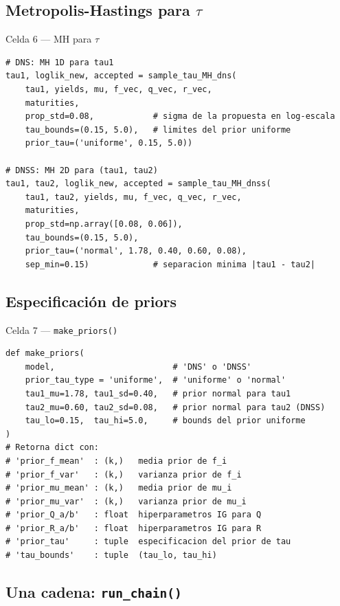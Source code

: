 \documentclass[12pt, a4paper]{article}
\theoremstyle{plain}
\theoremstyle{definition}
\theoremstyle{remark}
\begin{document}
\subsection{Metropolis-Hastings para $\tau$}

\begin{codigocaja}{Celda 6 — MH para $\tau$}
\begin{lstlisting}
# DNS: MH 1D para tau1
tau1, loglik_new, accepted = sample_tau_MH_dns(
    tau1, yields, mu, f_vec, q_vec, r_vec,
    maturities,
    prop_std=0.08,            # sigma de la propuesta en log-escala
    tau_bounds=(0.15, 5.0),   # limites del prior uniforme
    prior_tau=('uniforme', 0.15, 5.0))

# DNSS: MH 2D para (tau1, tau2)
tau1, tau2, loglik_new, accepted = sample_tau_MH_dnss(
    tau1, tau2, yields, mu, f_vec, q_vec, r_vec,
    maturities,
    prop_std=np.array([0.08, 0.06]),
    tau_bounds=(0.15, 5.0),
    prior_tau=('normal', 1.78, 0.40, 0.60, 0.08),
    sep_min=0.15)             # separacion minima |tau1 - tau2|
\end{lstlisting}
\end{codigocaja}

\subsection{Especificación de priors}

\begin{codigocaja}{Celda 7 — \texttt{make\_priors()}}
\begin{lstlisting}
def make_priors(
    model,                        # 'DNS' o 'DNSS'
    prior_tau_type = 'uniforme',  # 'uniforme' o 'normal'
    tau1_mu=1.78, tau1_sd=0.40,   # prior normal para tau1
    tau2_mu=0.60, tau2_sd=0.08,   # prior normal para tau2 (DNSS)
    tau_lo=0.15,  tau_hi=5.0,     # bounds del prior uniforme
)
# Retorna dict con:
# 'prior_f_mean'  : (k,)   media prior de f_i
# 'prior_f_var'   : (k,)   varianza prior de f_i
# 'prior_mu_mean' : (k,)   media prior de mu_i
# 'prior_mu_var'  : (k,)   varianza prior de mu_i
# 'prior_Q_a/b'   : float  hiperparametros IG para Q
# 'prior_R_a/b'   : float  hiperparametros IG para R
# 'prior_tau'     : tuple  especificacion del prior de tau
# 'tau_bounds'    : tuple  (tau_lo, tau_hi)
\end{lstlisting}
\end{codigocaja}

\subsection{Una cadena: \texttt{run\_chain()}}
\end{document}
